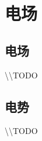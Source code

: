 
\section{电场}

\subsection{电场}

\textbackslash\textbackslash TODO

\subsection{电势}

\textbackslash\textbackslash TODO
